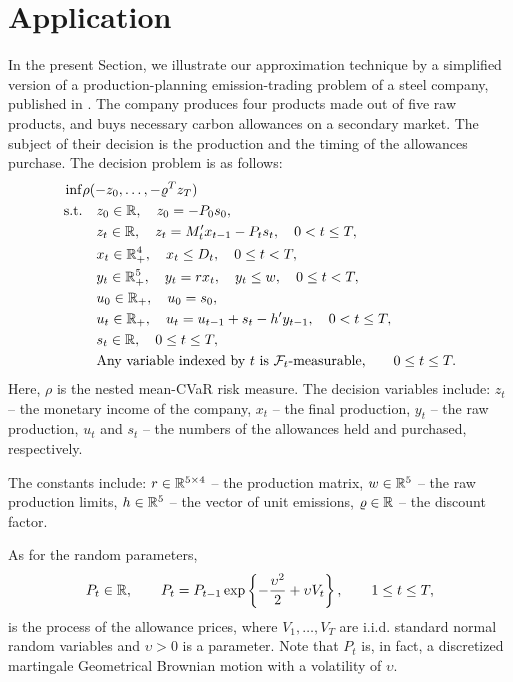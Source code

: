 \documentclass{article}              %
\begin{document}
\section{\label{sec:appl}Application}

In the present Section, we illustrate our approximation technique by
a simplified version of a production-planning emission-trading problem
of a steel company, published in \cite{zapletal2019multi}. The company produces
four products made out of five raw products, and buys necessary carbon allowances
on a secondary market. The subject of their decision is the production
and the timing of the allowances purchase. The decision problem is as follows:
\begin{align}
\inf & \rho(-z_{0},\dots,-\varrho^{T}z_{T})\label{eq:etp}\\
\text{s.t.} &\quad z_{0}\in\mathbb{R},\quad z_{0}=-P_{0}s_{0},\nonumber \\
 &\quad z_{t}\in\mathbb{R},\quad z_{t}=M'_{t}x_{t-1}-P_{t}s_{t},\quad 0<t\leq T, \nonumber \\
 &\quad x_{t}\in\mathbb{R}_{+}^{4},\quad x_{t}\leq D_{t},\quad 0\leq t<T,\nonumber \\
 &\quad y_{t}\in\mathbb{R}_{+}^{5},\quad y_{t}=rx_{t},\quad y_{t}\leq w,\quad 0\leq t<T,\nonumber \\
 &\quad u_{0}\in\mathbb{R}_{+},\quad u_{0}=s_{0},\nonumber \\
 &\quad u_{t}\in\mathbb{R}_{+},\quad u_{t}=u_{t-1}+s_{t}-h'y_{t-1},\quad 0<t\leq T,\nonumber \\
 &\quad s_{t}\in\mathbb{R},\quad 0\leq t \leq T,\nonumber\\
 &\quad \text{Any variable indexed by $t$ is $\mathcal{F}_t$-measurable,}\qquad 0\leq t\leq T. \nonumber 
\end{align}
Here, $\rho$ is the nested mean-CVaR risk measure. The decision variables include: $z_t$ -- the monetary income of the company, $x_t$ -- the final production, $y_t$ -- the raw production, $u_t$ and $s_t$ -- the numbers of the allowances held and purchased, respectively.

The constants include: $r \in \mathbb{R}^{5 \times 4}$ -- the production matrix, $w\in \mathbb{R}^5$ -- the raw production limits, $h \in \mathbb{R}^5$ -- the vector of unit emissions, $\varrho \in \mathbb{R}$ -- the discount factor.

As for the random parameters,
$$
P_t \in \mathbb{R},\qquad P_t = P_{t-1}\exp\left\{ -\frac{\upsilon^2}2 + \upsilon V_t \right\},
\qquad 1\leq t \leq T,
$$ 
is the process of the allowance prices, where $V_1,\dots,V_T$ are i.i.d. standard normal random variables and $\upsilon > 0$ is a parameter. Note that $P_t$ is, in fact, a discretized martingale Geometrical Brownian motion with a volatility of $\upsilon$.
\end{document}
